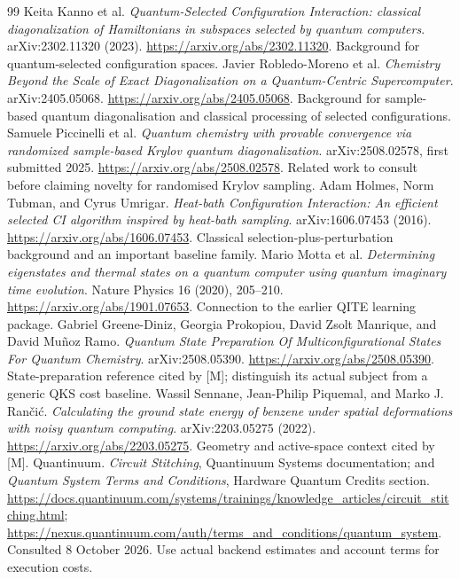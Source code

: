 \documentclass[11pt,a4paper,oneside]{report}
\begin{document}
\begin{thebibliography}{99}
 Keita Kanno et al. \textit{Quantum-Selected Configuration Interaction: classical diagonalization of Hamiltonians in subspaces selected by quantum computers}. arXiv:2302.11320 (2023). \url{https://arxiv.org/abs/2302.11320}. Background for quantum-selected configuration spaces.
 Javier Robledo-Moreno et al. \textit{Chemistry Beyond the Scale of Exact Diagonalization on a Quantum-Centric Supercomputer}. arXiv:2405.05068. \url{https://arxiv.org/abs/2405.05068}. Background for sample-based quantum diagonalisation and classical processing of selected configurations.
 Samuele Piccinelli et al. \textit{Quantum chemistry with provable convergence via randomized sample-based Krylov quantum diagonalization}. arXiv:2508.02578, first submitted 2025. \url{https://arxiv.org/abs/2508.02578}. Related work to consult before claiming novelty for randomised Krylov sampling.
 Adam Holmes, Norm Tubman, and Cyrus Umrigar. \textit{Heat-bath Configuration Interaction: An efficient selected CI algorithm inspired by heat-bath sampling}. arXiv:1606.07453 (2016). \url{https://arxiv.org/abs/1606.07453}. Classical selection-plus-perturbation background and an important baseline family.
 Mario Motta et al. \textit{Determining eigenstates and thermal states on a quantum computer using quantum imaginary time evolution}. Nature Physics 16 (2020), 205--210. \url{https://arxiv.org/abs/1901.07653}. Connection to the earlier QITE learning package.
 Gabriel Greene-Diniz, Georgia Prokopiou, David Zsolt Manrique, and David Mu\~noz Ramo. \textit{Quantum State Preparation Of Multiconfigurational States For Quantum Chemistry}. arXiv:2508.05390. \url{https://arxiv.org/abs/2508.05390}. State-preparation reference cited by [M]; distinguish its actual subject from a generic QKS cost baseline.
 Wassil Sennane, Jean-Philip Piquemal, and Marko J. Ran\v{c}i\'c. \textit{Calculating the ground state energy of benzene under spatial deformations with noisy quantum computing}. arXiv:2203.05275 (2022). \url{https://arxiv.org/abs/2203.05275}. Geometry and active-space context cited by [M].
 Quantinuum. \textit{Circuit Stitching}, Quantinuum Systems documentation; and \textit{Quantum System Terms and Conditions}, Hardware Quantum Credits section. \url{https://docs.quantinuum.com/systems/trainings/knowledge_articles/circuit_stitching.html}; \url{https://nexus.quantinuum.com/auth/terms_and_conditions/quantum_system}. Consulted 8 October 2026. Use actual backend estimates and account terms for execution costs.
\end{thebibliography}
\end{document}

